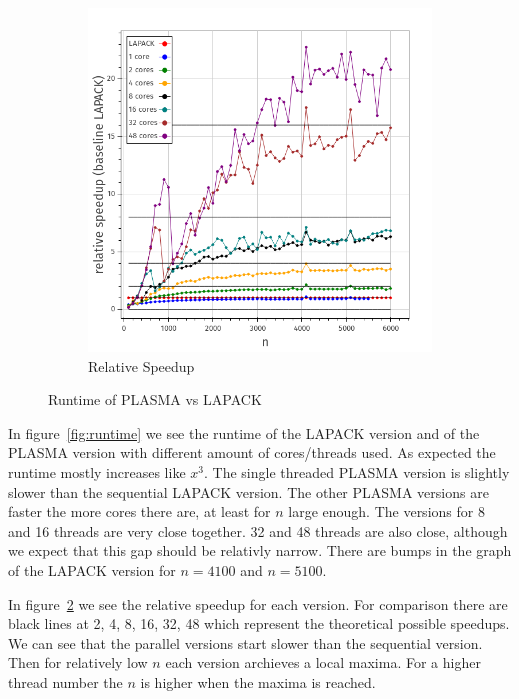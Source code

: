\documentclass[a4paper,final,ngerman,english]{article}
\begin{document}
\begin{figure}[h!]
\begin{subfigure}{0.46\textwidth}
		\includegraphics[width=\textwidth]{relSpeedup}
		\caption{Relative Speedup}
\label{fig:rel}
	\end{subfigure}
	\caption{Runtime of PLASMA vs LAPACK}
\end{figure}

In figure~\ref{fig:runtime}
we see the runtime of the LAPACK version and of the PLASMA version with different amount of cores/threads used.
As expected the runtime mostly increases like \(x^3\).
The single threaded PLASMA version is slightly slower than the sequential LAPACK version.
The other PLASMA versions are faster the more cores there are, at least for $n$ large enough.
The versions for 8 and 16 threads are very close together. 32 and 48 threads are also close, although
we expect that this gap should be relativly narrow.
There are bumps in the graph of the LAPACK version for \(n = 4100\) and \(n = 5100 \).

In figure~\ref{fig:rel}
we see the relative speedup for each version.
For comparison there are black lines at 2, 4, 8, 16, 32, 48 which represent the theoretical possible speedups.
We can see that the parallel versions start slower than the sequential version.
Then for relatively low $n$ each version archieves a local maxima.
For a higher thread number the $n$ is higher when the maxima is reached. 
\end{document}
